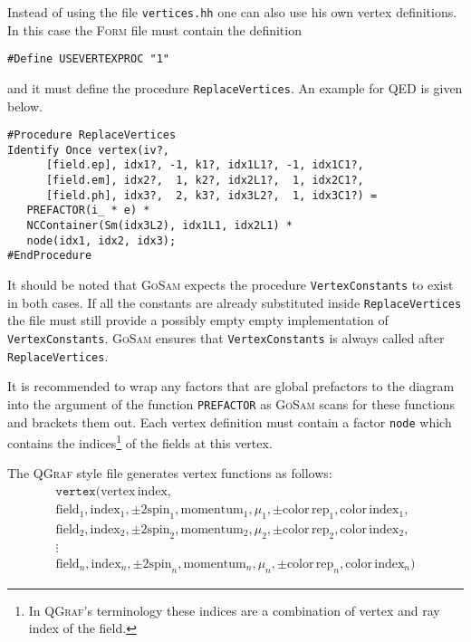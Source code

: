 \documentclass[11pt,a4paper]{refrep}
\newcommand{\gosamversion}{{3{.}0}}
\newcommand{\gosamv}[1][\gosamversion]{\textsc{GoSam}\xspace}
\newcommand{\qgraf}{\textsc{QGraf}\xspace}
\newcommand{\form}{\textsc{Form}\xspace}
\begin{document}
Instead of using the file \texttt{vertices.hh} one can also use
his own vertex definitions. In this case the \form{} file must contain
the definition
\begin{lstlisting}[style=form]
#Define USEVERTEXPROC "1"
\end{lstlisting}
and it must define the procedure \texttt{ReplaceVertices}. An example
for QED is given below.
\begin{maxipage}
\begin{lstlisting}[style=form]
#Procedure ReplaceVertices
Identify Once vertex(iv?,
      [field.ep], idx1?, -1, k1?, idx1L1?, -1, idx1C1?,
      [field.em], idx2?,  1, k2?, idx2L1?,  1, idx2C1?,
      [field.ph], idx3?,  2, k3?, idx3L2?,  1, idx3C1?) =
   PREFACTOR(i_ * e) *
   NCContainer(Sm(idx3L2), idx1L1, idx2L1) *
   node(idx1, idx2, idx3);
#EndProcedure
\end{lstlisting}
\end{maxipage}
It should be noted that \gosamv{} expects the procedure \texttt{VertexConstants}
to exist in both cases. If all the constants are already substituted inside
\texttt{ReplaceVertices} the file must still provide a possibly empty empty
implementation of \texttt{VertexConstants}. \gosamv{} ensures that
\texttt{VertexConstants} is always called after \texttt{ReplaceVertices}.

It is recommended to wrap any factors that are global prefactors to the diagram
into the argument of the function \texttt{PREFACTOR} as \gosamv{} scans for these
functions and brackets them out. Each vertex definition must contain a factor
\texttt{node} which contains the indices\footnote{In \qgraf's terminology
these indices are a combination of vertex and ray index of the field.}
of the fields at this vertex.

The \qgraf{} style file generates vertex functions as follows:
\begin{multline*}
\mathtt{vertex}(\mathrm{vertex\,index},\\
   \mathrm{field}_1, \mathrm{index}_1, \pm2\mathrm{spin}_1, \mathrm{momentum}_1, \mu_1, \pm\mathrm{color\,rep}_1, %
   \mathrm{color\,index}_1,\\
   \mathrm{field}_2, \mathrm{index}_2, \pm2\mathrm{spin}_2, \mathrm{momentum}_2, \mu_2, \pm\mathrm{color\,rep}_2, %
   \mathrm{color\,index}_2,\\
   \vdots\\
   \mathrm{field}_n, \mathrm{index}_n, \pm2\mathrm{spin}_n, \mathrm{momentum}_n, \mu_n, \pm\mathrm{color\,rep}_n, %
   \mathrm{color\,index}_n)
\end{multline*}
\end{document}
